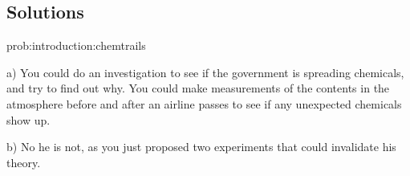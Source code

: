 \subsection{Solutions}
\begin{solution}{prob:introduction:chemtrails}\label{soln:introduction:chemtrails}


a) You could do an investigation to see if the government is spreading chemicals, and try to find out why. You could make measurements of the contents in the atmosphere before and after an airline passes to see if any unexpected chemicals show up.

b) No he is not, as you just proposed two experiments that could invalidate his theory.
\end{solution}





